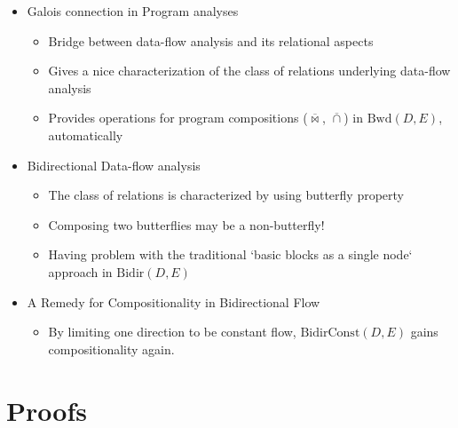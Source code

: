 \documentclass{llncs}
\newcommand{\Bidir}{\mathrm{Bidir}}
\newcommand{\Unidir}{\mathrm{Bwd}}
\newcommand{\UnidirConst}{\mathrm{BidirConst}}
\newcommand{\bowtielift}{\mathbin{\overline{\bowtie}}}
\newcommand{\caplift}{\mathbin{\overline{\cap}}}
\begin{document}
\begin{itemize}
    \item Galois connection in Program analyses
    \begin{itemize}
      \item Bridge between data-flow analysis and its relational aspects
      \item Gives a nice characterization of the class of relations underlying data-flow analysis
      \item Provides operations for program compositions ($\bowtielift$, $\caplift$) in $\Unidir(D, E)$, automatically
    \end{itemize}
    \item Bidirectional Data-flow analysis
    \begin{itemize}
      \item The class of relations is characterized by using butterfly property
      \item Composing two butterflies may be a non-butterfly!
      \item Having problem with the traditional `basic blocks as a single node` approach in $\Bidir(D, E)$
    \end{itemize}
    \item A Remedy for Compositionality in Bidirectional Flow
    \begin{itemize}
      \item By limiting one direction to be constant flow, $\UnidirConst(D, E)$ gains compositionality again.
    \end{itemize}
  \end{itemize}



\nocite{*}  %
  

  

\appendix
\section{Proofs}
\end{document}
